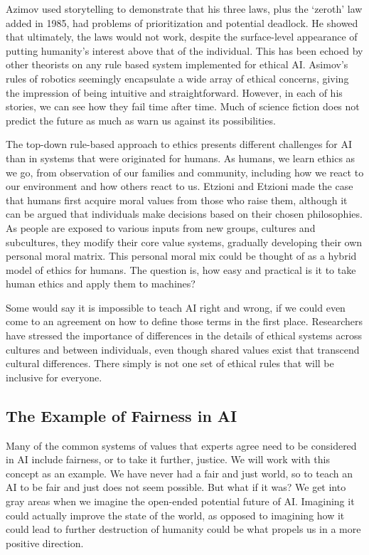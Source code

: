 \documentclass{svproc}
\begin{document}
%
Azimov used storytelling to demonstrate that his three laws, plus the ‘zeroth’ law added in 1985, had problems of prioritization and potential deadlock. He showed that ultimately, the laws would not work, despite the surface-level appearance of putting humanity’s interest above that of the individual. This has been echoed by other theorists on any rule based system implemented for ethical AI. Asimov’s rules of robotics seemingly encapsulate a wide array of ethical concerns, giving the impression of being intuitive and straightforward. However, in each of his stories, we can see how they fail time after time. \cite{Allen2005ArtificialApproaches}  Much of science fiction does not predict the future as much as warn us against its possibilities. 

%

The top-down rule-based approach to ethics presents different challenges for AI than in systems that were originated for humans. As humans, we learn ethics as we go, from observation of our families and community, including how we react to our environment and how others react to us. Etzioni and Etzioni \cite{Etzioni2017IncorporatingIntelligence} made the case that humans first acquire moral values from those who raise them, although it can be argued that individuals make decisions based on their chosen philosophies. As people are exposed to various inputs from new groups, cultures and subcultures, they modify their core value systems, gradually developing their own personal moral matrix. \cite{Etzioni2017IncorporatingIntelligence} This personal moral mix could be thought of as a hybrid model of ethics for humans. The question is, how easy and practical is it to take human ethics and apply them to machines?

%
Some would say it is impossible to teach AI right and wrong, if we could even come to an agreement on how to define those terms in the first place. Researchers have stressed the importance of differences in the details of ethical systems across cultures and between individuals, even though shared values exist that transcend cultural differences. \cite{Allen2005ArtificialApproaches} There simply is not one set of ethical rules that will be inclusive for everyone. 

\subsection{The Example of Fairness in AI
}

Many of the common systems of values that experts agree need to be considered in AI include fairness, or to take it further, justice. We will work with this concept as an example. We have never had a fair and just world, so to teach an AI to be fair and just does not seem possible. But what if it was? We get into gray areas when we imagine the open-ended potential future of AI. Imagining it could actually improve the state of the world, as opposed to imagining how it could lead to further destruction of humanity could be what propels us in a more positive direction. 
\end{document}
